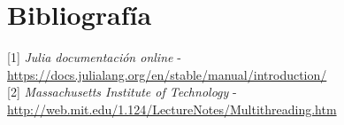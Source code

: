 \documentclass[10pt,a4paper]{article}
\begin{document}
\section{Bibliografía}
[1] \emph{Julia documentación online} - \href{https://docs.julialang.org/en/stable/manual/introduction/}{https://docs.julialang.org/en/stable/manual/introduction/}\\

[2]  \emph{Massachusetts Institute of Technology} - \href{http://web.mit.edu/1.124/LectureNotes/Multithreading.htm}{http://web.mit.edu/1.124/LectureNotes/Multithreading.htm}
\end{document}
